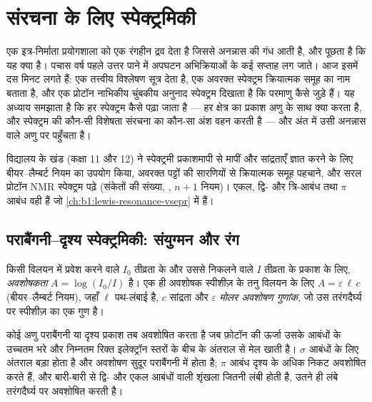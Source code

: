 \chapter{संरचना के लिए स्पेक्ट्रमिकी}\label{ch:b1:structure-spectroscopy}

एक इत्र-निर्माता प्रयोगशाला को एक रंगहीन द्रव देता है जिससे अनन्नास की गंध आती है,
और पूछता है कि यह क्या है। पचास वर्ष पहले उत्तर पाने में अपघटन अभिक्रियाओं के
कई सप्ताह लग जाते। आज इसमें दस मिनट लगते हैं: एक तत्त्वीय विश्लेषण सूत्र देता है,
एक अवरक्त स्पेक्ट्रम क्रियात्मक समूह का नाम बताता है, और एक प्रोटॉन नाभिकीय
चुंबकीय अनुनाद स्पेक्ट्रम दिखाता है कि परमाणु कैसे जुड़े हैं। यह अध्याय समझाता है
कि हर स्पेक्ट्रम कैसे पढ़ा जाता है --- हर क्षेत्र का प्रकाश अणु के साथ क्या करता है,
और स्पेक्ट्रम की कौन-सी विशेषता संरचना का कौन-सा अंश वहन करती है --- और
अंत में उसी अनन्नास वाले अणु पर पहुँचता है।

\begin{recall}
विद्यालय के खंड (कक्षा 11 और 12) ने स्पेक्ट्रमी प्रकाशमापी से  मापीं और
सांद्रताएँ ज्ञात करने के लिए बीयर--लैम्बर्ट नियम का उपयोग किया, अवरक्त पट्टों की
सारणियों से क्रियात्मक समूह पहचाने, और सरल प्रोटॉन NMR स्पेक्ट्रम पढ़े
(संकेतों की संख्या, , $n + 1$
नियम)। एकल, द्वि- और त्रि-आबंध तथा $\pi$ आबंध वही हैं जो
\cref{ch:b1:lewis-resonance-vsepr} में हैं।
\end{recall}

\section{पराबैंगनी--दृश्य स्पेक्ट्रमिकी: संयुग्मन और रंग}

\begin{definition}\label{def:b1:structure-spectroscopy:absorbance}
किसी विलयन में प्रवेश करने वाले $I_0$ तीव्रता के और उससे निकलने वाले $I$ तीव्रता के प्रकाश के लिए,
\emph{अवशोषकता} $A = \log(I_0/I)$ है। एक ही अवशोषक स्पीशीज़ के
तनु विलयन के लिए $A = \varepsilon\,\ell\,c$ (बीयर--लैम्बर्ट नियम), जहाँ $\ell$
पथ-लंबाई है, $c$
सांद्रता और $\varepsilon$ \emph{मोलर अवशोषण
गुणांक}, जो उस तरंगदैर्घ्य पर स्पीशीज़ का एक
गुण है।
\end{definition}

कोई अणु पराबैंगनी या दृश्य प्रकाश तब अवशोषित करता है जब फ़ोटॉन की ऊर्जा
उसके आबंधों के उच्चतम भरे और निम्नतम रिक्त इलेक्ट्रॉन स्तरों के बीच के
अंतराल से मेल खाती है। $\sigma$ आबंधों के लिए अंतराल बड़ा होता है और
अवशोषण सुदूर पराबैंगनी में होता है; $\pi$ आबंध दृश्य के अधिक निकट अवशोषित करते हैं,
और बारी-बारी से द्वि- और एकल आबंधों वाली शृंखला जितनी लंबी होती है, उतने ही
लंबे तरंगदैर्घ्य पर अवशोषित करती है।

